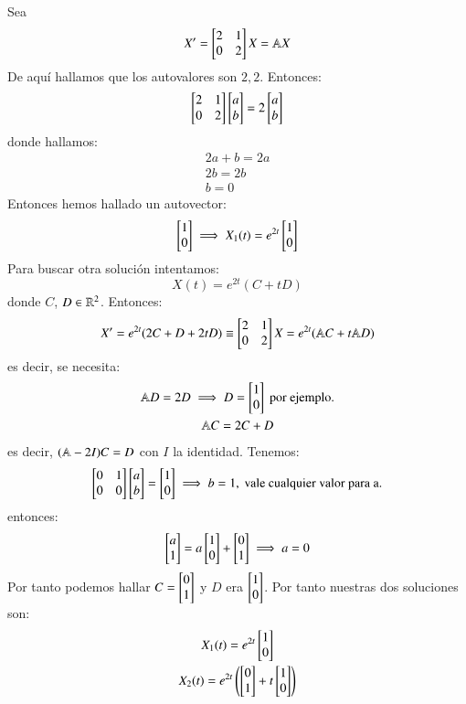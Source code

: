 \begin{eg}
    Sea
    $$
        X' = \mx{2 & 1\\0&2} X = \A X
    $$
    De aquí hallamos que los autovalores son $2, 2$.
    Entonces:
    $$
        \mx{2 & 1\\0&2} \mx{a \\ b} = 2 \mx{a \\ b}
    $$
    donde hallamos:
    \begin{gather}
        2a+b=2a\\
        2b=2b\\
        b=0
    \end{gather}
    Entonces hemos hallado un autovector:
    $$
        \mx{1\\0} \implies X_1(t) = e^{2t}\mx{1\\0}
    $$
    Para buscar otra solución intentamos:
    $$X(t) = e^{2t} (C + tD)$$
    donde $C$, $D \in \mathbb{R}^2$.
    Entonces:
    $$
        X' = e^{2t}(2C + D + 2tD) \equiv \mx{2 & 1\\0&2} X = e^{2t}(\A C + t \A D)
    $$
    es decir, se necesita:
    \begin{gather*}
        \A D = 2 D \implies D = \mx{1\\0} \text{ por ejemplo.}\\
        \A C = 2C + D
    \end{gather*}
    es decir, $(\mathbb{A} - 2I) C = D$ con $I$ la identidad. Tenemos:
    $$
    \mx{0 & 1\\0&0}\mx{a\\b} = \mx{1\\0} \implies b=1, \text{ vale cualquier valor para a.}
    $$
    entonces:
    $$
        \mx{a\\1} = a\mx{1\\0} + \mx{0\\1} \implies a = 0
    $$
    Por tanto podemos hallar $C = \mx{0\\1}$ y $D$ era $\mx{1\\0}$. Por tanto nuestras dos soluciones son:
    \begin{gather*}
        X_1(t) = e^{2t}\mx{1\\0}\\
        X_2(t) = e^{2t}\left(\mx{0\\1} + t \mx{1\\0}\right)
    \end{gather*}
\end{eg}

